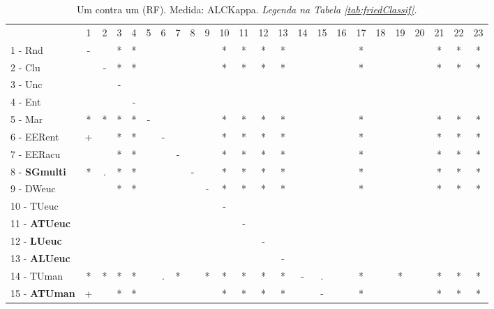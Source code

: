 \begin{table}[h]
\caption{Um contra um (RF). Medida: ALCKappa. \textit{Legenda na Tabela \ref{tab:friedClassif}.}}
\begin{center}\begin{tabular}{lcc|cc|cc|cc|cc|cc|cc|cc|cc|cc|cc|c}
 			& 1 & 2 & 3 & 4 & 5 & 6 & 7 & 8 & 9 & 10 & 11 & 12 & 13 & 14 & 15 & 16 & 17 & 18 & 19 & 20 & 21 & 22 & 23\\
1 - Rnd  	& - &   & * & * &   &   &   &   &   & * & * & * & * &   &   &   & * &   &   &   & * & * & * \\
2 - Clu  	&   & - & * & * &   &   &   &   &   & * & * & * & * &   &   &   & * &   &   &   & * & * & * \\ \hline
3 - Unc  	&   &   & - &   &   &   &   &   &   &   &   &   &   &   &   &   &   &   &   &   &   &   &   \\
4 - Ent  	&   &   &   & - &   &   &   &   &   &   &   &   &   &   &   &   &   &   &   &   &   &   &   \\ \hline
5 - Mar  	& * & * & * & * & - &   &   &   &   & * & * & * & * &   &   &   & * &   &   &   & * & * & * \\
6 - EERent	& + &   & * & * &   & - &   &   &   & * & * & * & * &   &   &   & * &   &   &   & * & * & * \\ \hline
7 - EERacu	&   &   & * & * &   &   & - &   &   & * & * & * & * &   &   &   & * &   &   &   & * & * & * \\
8 - \textbf{SGmulti}	& * & . & * & * &   &   &   & - &   & * & * & * & * &   &   &   & * &   &   &   & * & * & * \\ \hline
9 - DWeuc	&   &   & * & * &   &   &   &   & - & * & * & * & * &   &   &   & * &   &   &   & * & * & * \\
10 - TUeuc	&   &   &   &   &   &   &   &   &   & - &   &   &   &   &   &   &   &   &   &   &   &   &   \\ \hline
11 - \textbf{ATUeuc}	&   &   &   &   &   &   &   &   &   &   & - &   &   &   &   &   &   &   &   &   &   &   &   \\
12 - \textbf{LUeuc}	&   &   &   &   &   &   &   &   &   &   &   & - &   &   &   &   &   &   &   &   &   &   &   \\ \hline
13 - \textbf{ALUeuc}	&   &   &   &   &   &   &   &   &   &   &   &   & - &   &   &   &   &   &   &   &   &   &   \\
14 - TUman	& * & * & * & * &   & . & * &   & * & * & * & * & * & - & . &   & * &   & * &   & * & * & * \\ \hline
15 - \textbf{ATUman}	& + &   & * & * &   &   &   &   &   & * & * & * & * &   & - &   & * &   &   &   & * & * & * \\

\end{tabular}
\end{center}
\end{table}

